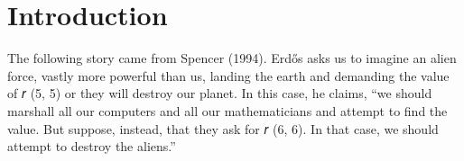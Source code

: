 \chapter{Introduction}
The following story came from Spencer (1994).
Erdős asks us to imagine an alien force, vastly more powerful than us, landing
the earth and demanding the value of 𝑟 (5, 5) or they will destroy our planet. In this
case, he claims, “we should marshall all our computers and all our mathematicians
and attempt to find the value. But suppose, instead, that they ask for 𝑟 (6, 6). In that
case, we should attempt to destroy the aliens.”

